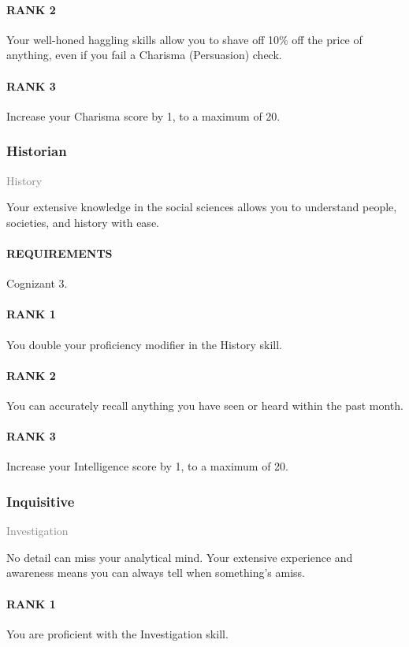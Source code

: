 \paragraph{RANK 2} Your well-honed haggling skills allow you to shave off 10\% off the price of anything, even if you fail a Charisma (Persuasion) check.
\paragraph{RANK 3} Increase your Charisma score by 1, to a maximum of 20.

\subsubsection{Historian} \label{feat::historian}
\small{\textcolor{gray}{History}}

\normalsize
Your extensive knowledge in the social sciences allows you to understand people, societies, and history with ease.
\paragraph{REQUIREMENTS} Cognizant 3.
\paragraph{RANK 1} You double your proficiency modifier in the History skill.
\paragraph{RANK 2} You can accurately recall anything you have seen or heard within the past month.
\paragraph{RANK 3} Increase your Intelligence score by 1, to a maximum of 20.

\subsubsection{Inquisitive} \label{feat::inquisitive}
\small{\textcolor{gray}{Investigation}}

\normalsize
No detail can miss your analytical mind.
Your extensive experience and awareness means you can always tell when something's amiss.
\paragraph{RANK 1} You are proficient with the Investigation skill.
